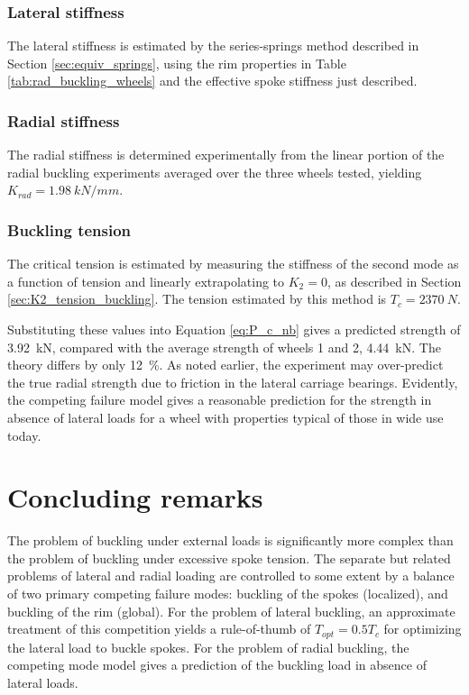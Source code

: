\documentclass[\rootdir/thesis.tex]{subfiles}
\begin{document}
\subsubsection*{Lateral stiffness}

The lateral stiffness is estimated by the series-springs method described in Section \ref{sec:equiv_springs}, using the rim properties in Table \ref{tab:rad_buckling_wheels} and the effective spoke stiffness just described.

\subsubsection*{Radial stiffness}

The radial stiffness is determined experimentally from the linear portion of the radial buckling experiments averaged over the three wheels tested, yielding $K_{rad}=\SI{1.98}{kN/mm}$.

\subsubsection*{Buckling tension}

The critical tension is estimated by measuring the stiffness of the second mode as a function of tension and linearly extrapolating to $K_2=0$, as described in Section \ref{sec:K2_tension_buckling}. The tension estimated by this method is $T_c = \SI{2370}{N}$.

Substituting these values into Equation \eqref{eq:P_c_nb} gives a predicted strength of \SI{3.92}{kN}, compared with the average strength of wheels 1 and 2, \SI{4.44}{kN}. The theory differs by only \SI{12}{\percent}. As noted earlier, the experiment may over-predict the true radial strength due to friction in the lateral carriage bearings. Evidently, the competing failure model gives a reasonable prediction for the strength in absence of lateral loads for a wheel with properties typical of those in wide use today.

\section{Concluding remarks}

The problem of buckling under external loads is significantly more complex than the problem of buckling under excessive spoke tension. The separate but related problems of lateral and radial loading are controlled to some extent by a balance of two primary competing failure modes: buckling of the spokes (localized), and buckling of the rim (global). For the problem of lateral buckling, an approximate treatment of this competition yields a rule-of-thumb of $T_{opt} = 0.5T_c$ for optimizing the lateral load to buckle spokes. For the problem of radial buckling, the competing mode model gives a prediction of the buckling load in absence of lateral loads.
\end{document}
